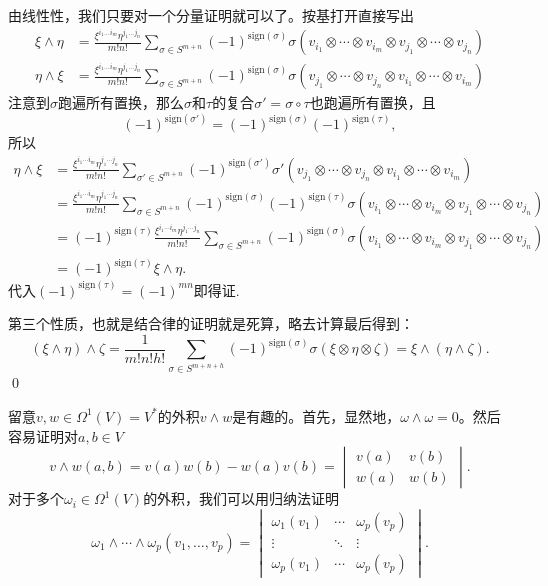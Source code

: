 	由线性性，我们只要对一个分量证明就可以了。按基打开直接写出
	\[
		\begin{split}
			\xi \wedge \eta&=\frac{\xi^{i_1\dots i_m}\eta^{j_1 \dots j_n}}{m!n!}\sum_{\sigma\in S^{m+n}}(-1)^{\mathrm{sign}(\sigma)}\sigma(v_{i_1}\otimes \cdots \otimes v_{i_m}\otimes v_{j_1}\otimes \cdots \otimes v_{j_n})\\
			\eta \wedge \xi&=\frac{\xi^{i_1\dots i_m}\eta^{j_1 \dots j_n}}{m!n!}\sum_{\sigma\in S^{m+n}}(-1)^{\mathrm{sign}(\sigma)}\sigma(v_{j_1}\otimes \cdots \otimes v_{j_n}\otimes v_{i_1}\otimes \cdots \otimes v_{i_m})
		\end{split}
	\]
	注意到$\sigma$跑遍所有置换，那么$\sigma$和$\tau$的复合$\sigma'=\sigma\circ\tau$也跑遍所有置换，且
	\[(-1)^{\mathrm{sign}(\sigma')}=(-1)^{\mathrm{sign}(\sigma)}(-1)^{\mathrm{sign}(\tau)},\]所以
	\[
		\begin{split}
			\eta \wedge \xi&=\frac{\xi^{i_1\cdots i_m}\eta^{j_1 \cdots j_n}}{m!n!}\sum_{\sigma'\in S^{m+n}}(-1)^{\mathrm{sign}(\sigma')}\sigma'(v_{j_1}\otimes \cdots \otimes v_{j_n}\otimes v_{i_1}\otimes \cdots \otimes v_{i_m})\\
			&=\frac{\xi^{i_1\cdots i_m}\eta^{j_1 \cdots j_n}}{m!n!}\sum_{\sigma\in S^{m+n}}(-1)^{\mathrm{sign}(\sigma)}(-1)^{\mathrm{sign}(\tau)}\sigma(v_{i_1}\otimes \cdots \otimes v_{i_m}\otimes v_{j_1}\otimes \cdots \otimes v_{j_n})\\
			&=(-1)^{\mathrm{sign}(\tau)}\frac{\xi^{i_1\cdots i_m}\eta^{j_1 \cdots j_n}}{m!n!}\sum_{\sigma\in S^{m+n}}(-1)^{\mathrm{sign}(\sigma)}\sigma(v_{i_1}\otimes \cdots \otimes v_{i_m}\otimes v_{j_1}\otimes \cdots \otimes v_{j_n})\\
			&=(-1)^{\mathrm{sign}(\tau)} \xi \wedge \eta.
		\end{split}
	\]
	代入$(-1)^{\mathrm{sign}(\tau)}=(-1)^{mn}$即得证.

	第三个性质，也就是结合律的证明就是死算，略去计算最后得到：
	\[
		(\xi \wedge \eta) \wedge \zeta=\frac{1}{m!n!h!}\sum_{\sigma\in S^{m+n+h}}(-1)^{\mathrm{sign}(\sigma)}\sigma(\xi \otimes \eta \otimes \zeta)=\xi \wedge (\eta \wedge \zeta).
	\]
	\qed

\para 留意$v,w\in \Omega^1(V)=V^*$的外积$v\wedge w$是有趣的。首先，显然地，$\omega\wedge\omega=0$。然后容易证明对$a,b\in V$
\[
	v\wedge w(a,b)=v(a)w(b)- w(a)v(b)=\begin{vmatrix}v(a)&v(b)\\w(a)&w(b)\end{vmatrix}.
\]
对于多个$\omega_i \in \Omega^1(V)$的外积，我们可以用归纳法证明
\[
	\omega_1\wedge \cdots \wedge\omega_p(v_1,\dots,v_p)=
	\begin{vmatrix}
		\omega_1(v_1)&\cdots&\omega_p(v_p)\\
		\vdots&\ddots&\vdots\\
		\omega_p(v_1)&\cdots&\omega_p(v_p)
	\end{vmatrix}.
\]

